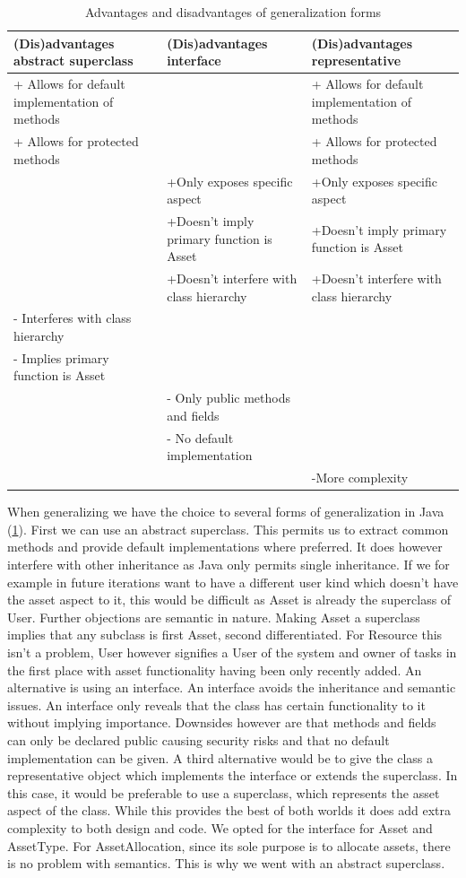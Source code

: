 				\begin{table}
					\begin{tabular}{|p{4cm}|p{4cm}|p{4cm}|}
					\hline
					(Dis)advantages abstract superclass & (Dis)advantages interface & (Dis)advantages representative \\
					\hline
					+ Allows for default implementation of methods&&+ Allows for default implementation of methods\\
					+ Allows for protected methods&&+ Allows for protected methods\\
					&+Only exposes specific aspect&+Only exposes specific aspect\\
					&+Doesn't imply primary function is Asset&+Doesn't imply primary function is Asset\\
					&+Doesn't interfere with class hierarchy&+Doesn't interfere with class hierarchy\\
					\hline
					- Interferes with class hierarchy&&\\
					- Implies primary function is Asset&&\\
					&- Only public methods and fields&\\
					&- No default implementation&\\
					&& -More complexity\\
					\hline
					\end{tabular}

				\caption{Advantages and disadvantages of generalization forms}
				\label{generalization}
				\end{table}
				
				When generalizing we have the choice to several forms of generalization in Java (\ref{generalization}). First we can use an abstract superclass. This permits us to extract common methods and provide default implementations where preferred. It does however interfere with other inheritance as Java only permits single inheritance. If we for example in future iterations want to have a different user kind which doesn't have the asset aspect to it, this would be difficult as Asset is already the superclass of User. Further objections are semantic in nature. Making Asset a superclass implies that any subclass is first Asset, second differentiated. For Resource this isn't a problem, User however signifies a User of the system and owner of tasks in the first place with asset functionality having been only recently added. An alternative is using an interface. An interface avoids the inheritance and semantic issues. An interface only reveals that the class has certain functionality to it without implying importance. Downsides however are that methods and fields can only be declared public causing security risks and that no default implementation can be given. A third alternative would be to give the class a representative object which implements the interface or extends the superclass. In this case, it would be preferable to use a superclass, which represents the asset aspect of the class. While this provides the best of both worlds it does add extra complexity to both design and code. We opted for the interface for Asset and AssetType. For AssetAllocation, since its sole purpose is to allocate assets, there is no problem with semantics. This is why we went with an abstract superclass.
				
